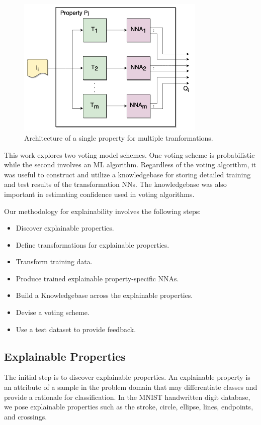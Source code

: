 \documentclass[conference]{IEEEtran}
\begin{document}
 \begin{figure}[htbp]
\centerline{\includegraphics[width=90mm]{./images/property_transforms.png}}
\caption{Architecture of a single property for multiple tranformations.}
\label{proptrans}
\end{figure}

This work explores two voting model schemes.  One voting scheme is probabilistic while the second involves an ML algorithm.  Regardless of the voting algorithm, it was useful to construct and utilize a knowledgebase for storing detailed training and test results of the transformation NNs.  The knowledgebase was also important in estimating confidence used in voting algorithms. 
 
Our methodology for explainability involves the following steps:
\begin{itemize}
\item Discover explainable properties.
\item Define transformations for explainable properties.
\item Transform training data.
\item Produce trained explainable property-specific NNAs.
\item Build a Knowledgebase across the explainable properties.
\item Devise a voting scheme.
\item Use a test dataset to provide feedback.
\end{itemize}

\subsection{Explainable Properties}
The initial step is to discover explainable properties.  An explainable property is an attribute of a sample in the problem domain that may differentiate classes and provide a rationale for classification.  In the MNIST handwritten digit database, we pose explainable properties such as the stroke, circle, ellipse, lines, endpoints, and crossings.
\end{document}
